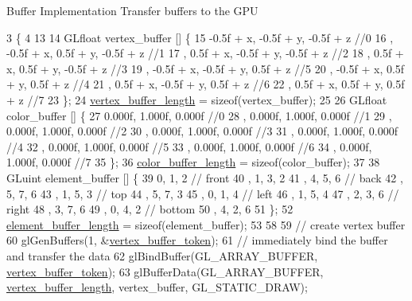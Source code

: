 Buffer Implementation Transfer buffers to the G\+P\+U
\begin{DoxyCode}
3                                                       \{
4 
13 
14   GLfloat vertex\_buffer [] \{
15       -0.5f + x, -0.5f + y, -0.5f + z   \textcolor{comment}{//0}
16     , -0.5f + x,  0.5f + y, -0.5f + z   \textcolor{comment}{//1}
17     ,  0.5f + x, -0.5f + y, -0.5f + z   \textcolor{comment}{//2}
18     ,  0.5f + x,  0.5f + y, -0.5f + z   \textcolor{comment}{//3}
19     , -0.5f + x, -0.5f + y,  0.5f + z   \textcolor{comment}{//5}
20     , -0.5f + x,  0.5f + y,  0.5f + z   \textcolor{comment}{//4}
21     ,  0.5f + x, -0.5f + y,  0.5f + z   \textcolor{comment}{//6}
22     ,  0.5f + x,  0.5f + y,  0.5f + z   \textcolor{comment}{//7}
23   \};
24   \hyperlink{classFloorAsset_a9edf10bbcfbc61006fafb4a10d826a76}{vertex\_buffer\_length} = \textcolor{keyword}{sizeof}(vertex\_buffer);
25 
26   GLfloat color\_buffer [] \{
27       0.000f, 1.000f, 0.000f \textcolor{comment}{//0}
28     , 0.000f, 1.000f, 0.000f \textcolor{comment}{//1}
29     , 0.000f, 1.000f, 0.000f \textcolor{comment}{//2}
30     , 0.000f, 1.000f, 0.000f \textcolor{comment}{//3}
31     , 0.000f, 1.000f, 0.000f \textcolor{comment}{//4}
32     , 0.000f, 1.000f, 0.000f \textcolor{comment}{//5}
33     , 0.000f, 1.000f, 0.000f \textcolor{comment}{//6}
34     , 0.000f, 1.000f, 0.000f \textcolor{comment}{//7}
35   \};
36   \hyperlink{classFloorAsset_a5e4aa3ffef39690775a950c85fb08a2a}{color\_buffer\_length} = \textcolor{keyword}{sizeof}(color\_buffer);
37 
38   GLuint element\_buffer []  \{
39       0, 1, 2  \textcolor{comment}{// front}
40     , 1, 3, 2  
41     , 4, 5, 6  \textcolor{comment}{// back}
42     , 5, 7, 6  
43     , 1, 5, 3  \textcolor{comment}{// top}
44     , 5, 7, 3 
45     , 0, 1, 4  \textcolor{comment}{// left}
46     , 1, 5, 4  
47     , 2, 3, 6  \textcolor{comment}{// right}
48     , 3, 7, 6  
49     , 0, 4, 2  \textcolor{comment}{// bottom}
50     , 4, 2, 6     
51   \};
52   \hyperlink{classFloorAsset_ad42145830ac04a31ca27fd290cf0ef08}{element\_buffer\_length} = \textcolor{keyword}{sizeof}(element\_buffer);
53 
58 
59   \textcolor{comment}{// create vertex buffer}
60   glGenBuffers(1, &\hyperlink{classFloorAsset_a5fdd868b2e2a52dabfe2387c903e3862}{vertex\_buffer\_token});
61   \textcolor{comment}{// immediately bind the buffer and transfer the data}
62   glBindBuffer(GL\_ARRAY\_BUFFER, \hyperlink{classFloorAsset_a5fdd868b2e2a52dabfe2387c903e3862}{vertex\_buffer\_token});
63   glBufferData(GL\_ARRAY\_BUFFER, \hyperlink{classFloorAsset_a9edf10bbcfbc61006fafb4a10d826a76}{vertex\_buffer\_length}, vertex\_buffer, GL\_STATIC\_DRAW);

\end{DoxyCode}
